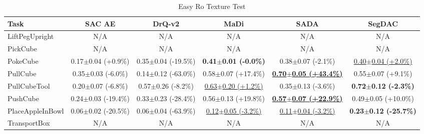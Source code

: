 \begin{table}[htbp]
\centering
\scriptsize
\caption{Easy Ro Texture Test}
\label{tab:appendix_rotexturetest_easy}
\begin{adjustbox}{max width=\textwidth}
\begin{tabular}{l*{5}{c}}
\toprule
\textbf{Task} & \textbf{SAC AE} & \textbf{DrQ-v2} & \textbf{MaDi} & \textbf{SADA} & \textbf{SegDAC} \\
\midrule
LiftPegUpright & N/A & N/A & N/A & N/A & N/A \\
PickCube & N/A & N/A & N/A & N/A & N/A \\
PokeCube & 0.17$\pm$0.04 \scriptsize{(+0.9\%)} & 0.35$\pm$0.04 \scriptsize{(-19.5\%)} & \textbf{0.41$\pm$0.01 \scriptsize{(-0.0\%)}} & 0.38$\pm$0.07 \scriptsize{(-2.1\%)} & \underline{0.40$\pm$0.04 \scriptsize{(+2.0\%)}} \\
PullCube & 0.35$\pm$0.03 \scriptsize{(-6.0\%)} & 0.14$\pm$0.12 \scriptsize{(-63.0\%)} & 0.58$\pm$0.07 \scriptsize{(+17.4\%)} & \textbf{\underline{0.70$\pm$0.05 \scriptsize{(+43.4\%)}}} & 0.55$\pm$0.07 \scriptsize{(+9.1\%)} \\
PullCubeTool & 0.20$\pm$0.07 \scriptsize{(-6.8\%)} & 0.57$\pm$0.26 \scriptsize{(-8.2\%)} & \underline{0.63$\pm$0.20 \scriptsize{(+1.2\%)}} & 0.35$\pm$0.13 \scriptsize{(-3.6\%)} & \textbf{0.72$\pm$0.12 \scriptsize{(-2.3\%)}} \\
PushCube & 0.24$\pm$0.03 \scriptsize{(-19.4\%)} & 0.33$\pm$0.23 \scriptsize{(-28.4\%)} & 0.56$\pm$0.13 \scriptsize{(+19.8\%)} & \textbf{\underline{0.57$\pm$0.07 \scriptsize{(+22.9\%)}}} & 0.49$\pm$0.05 \scriptsize{(+10.0\%)} \\
PlaceAppleInBowl & 0.06$\pm$0.02 \scriptsize{(-20.5\%)} & 0.06$\pm$0.04 \scriptsize{(-63.9\%)} & \underline{0.12$\pm$0.05 \scriptsize{(-3.2\%)}} & \underline{0.11$\pm$0.04 \scriptsize{(-3.2\%)}} & \textbf{0.23$\pm$0.12 \scriptsize{(-25.7\%)}} \\
TransportBox & N/A & N/A & N/A & N/A & N/A \\
\bottomrule
\end{tabular}
\end{adjustbox}
\end{table}

